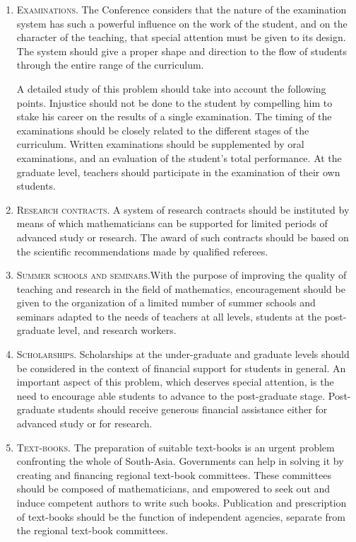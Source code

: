 \begin{enumerate}
\item \textsc{Examinations.} The Conference considers that the nature of the examination system has such a powerful influence on the work of the student, and on the character of the teaching, that special attention must be given to its design. The system should give a proper shape and direction to the flow of students through the entire range of the curriculum.

A detailed study of this problem should take into account the following points. Injustice should not be done to the student by compelling him to stake his career on the results of a single examination. The timing of the examinations should be closely related to the different stages of the curriculum. Written examinations should be supplemented by oral examinations, and an evaluation of the student's total performance. At the graduate level, teachers should participate in the examination of their own students.

\item \textsc{Research contracts.} A system of research contracts should be instituted by means of which mathematicians can be supported for limited periods of advanced study or research. The award of such contracts should be based on the scientific recommendations made by qualified referees.

\item \textsc{Summer schools and seminars.}\pageoriginale With the purpose of improving the quality of teaching and research in the field of mathematics, encouragement should be given to the organization of a limited number of summer schools and seminars adapted to the needs of teachers at all levels, students at the post-graduate level, and research workers.

\item \textsc{Scholarships.} Scholarships at the under-graduate and graduate levels should be considered in the context of financial support for students in general. An important aspect of this problem, which deserves special attention, is the need to encourage able students to advance to the post-graduate stage. Post-graduate students should receive generous financial assistance either for advanced study or for research.

\item \textsc{Text-books.} The preparation of suitable text-books is an urgent problem confronting the whole of South-Asia. Governments can help in solving it by creating and financing regional text-book committees. These committees should be composed of mathematicians, and empowered to seek out and induce competent authors to write such books. Publication and prescription of text-books should be the function of independent agencies, separate from the regional text-book committees.
\end{enumerate}

